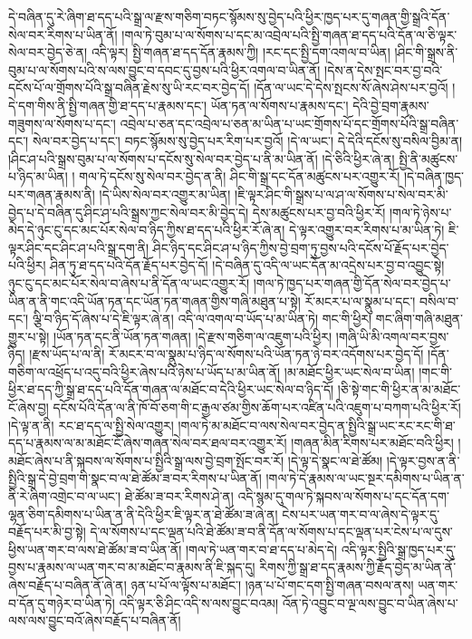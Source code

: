 དེ་བཞིན་དུ་རེ་ཞིག་ཐ་དད་པའི་སྒྲ་ལ་རྫས་གཅིག་བཏང་སྙོམས་སུ་བྱེད་པའི་ཕྱིར་ཁྱད་པར་དུ་གཞན་གྱི་སྒྲའི་དོན་སེལ་བར་རིགས་པ་ཡིན་ནོ། །གལ་ཏེ་བུམ་པ་ལ་སོགས་པ་དང་མ་འབྲེལ་པའི་སྤྱི་གཞན་ཐ་དད་པའི་དོན་ལ་ཅི་ལྟར་སེལ་བར་བྱེད་ཅེ་ན། འདི་ལྟར། སྤྱི་གཞན་ཐ་དད་དོན་རྣམས་ཀྱི། །རང་དང་སྤྱི་དག་འགལ་བ་ཡིན། །ཤིང་གི་སྒྲས་ནི་བུམ་པ་ལ་སོགས་པའི་ས་ལས་བྱུང་བ་དབང་དུ་བྱས་པའི་ཕྱིར་འགལ་བ་ཡིན་ནོ། །དེས་ན་དེས་སྤང་བར་བྱ་བའི་དངོས་པོ་ལ་གྲོགས་པོའི་སྒྲ་བཞིན་རྗེས་སུ་ཡི་རང་བར་བྱེད་དོ། །དོན་ལ་ཡང་དེ་དེས་སྤངས་སོ་ཞེས་ཤེས་པར་བྱའོ། །དེ་དག་གིས་ནི་སྤྱི་གཞན་གྱི་ཐ་དད་པ་རྣམས་དང་། ཡོན་ཏན་ལ་སོགས་པ་རྣམས་དང་། དེའི་བྱེ་བྲག་རྣམས་གཟུགས་ལ་སོགས་པ་དང་། འབྲེལ་པ་ཅན་དང་འབྲེལ་པ་ཅན་མ་ཡིན་པ་ཡང་གྲོགས་པོ་དང་གྲོགས་པོའི་སྒྲ་བཞིན་དང་། སེལ་བར་བྱེད་པ་དང་། བཏང་སྙོམས་སུ་བྱེད་པར་རིག་པར་བྱའོ། །དེ་ལ་ཡང་། དེ་དེའི་དངོས་སུ་བསིལ་བྱིམ་ན། །ཤིང་ཤ་པའི་སྒྲས་བུམ་པ་ལ་སོགས་པ་དངོས་སུ་སེལ་བར་བྱེད་པ་ནི་མ་ཡིན་ནོ། །དེ་ཅིའི་ཕྱིར་ཞེ་ན། སྤྱི་ནི་མཚུངས་པ་ཉིད་མ་ཡིན། །
གལ་ཏེ་དངོས་སུ་སེལ་བར་བྱེད་ན་ནི། ཤིང་གི་སྒྲ་དང་དོན་མཚུངས་པར་འགྱུར་རོ། །དེ་བཞིན་ཁྱད་པར་གཞན་རྣམས་ནི། །དེ་ཡིས་སེལ་བར་འགྱུར་མ་ཡིན། །ཇི་ལྟར་ཤིང་གི་སྒྲས་པ་ལ་ཤ་ལ་སོགས་པ་སེལ་བར་མི་བྱེད་པ་དེ་བཞིན་དུ་ཤིང་ཤ་པའི་སྒྲས་ཀྱང་སེལ་བར་མི་བྱེད་དེ། དེས་མཚུངས་པར་བྱ་བའི་ཕྱིར་རོ། །གལ་ཏེ་ཉེས་པ་མེད་དེ་ཉུང་ངུ་དང་མང་པོར་སེལ་བ་ཉིད་ཀྱིས་ཐ་དད་པའི་ཕྱིར་རོ་ཞེ་ན། དེ་ལྟར་འགྱུར་བར་རིགས་པ་མ་ཡིན་ཏེ། ཇི་ལྟར་ཤིང་དང་ཤིང་ཤ་པའི་སྒྲ་དག་ནི། ཤིང་ཉིད་དང་ཤིང་ཤ་པ་ཉིད་ཀྱིས་བྱེ་བྲག་ཏུ་བྱས་པའི་དངོས་པོ་རྗོད་པར་བྱེད་པའི་ཕྱིར། ཤིན་ཏུ་ཐ་དད་པའི་དོན་རྗོད་པར་བྱེད་དོ། །དེ་བཞིན་དུ་འདི་ལ་ཡང་དོན་མ་འདྲེས་པར་བྱ་བ་འབྱུང་སྟེ། ཉུང་ངུ་དང་མང་པོར་སེལ་བ་ཞེས་པ་ནི་དོན་ལ་ཡང་འགྱུར་རོ། །གལ་ཏེ་ཁྱད་པར་གཞན་གྱི་དོན་སེལ་བར་བྱེད་པ་ཡིན་ན་ནི་གང་འདི་ཡོན་ཏན་དང་ཡོན་ཏན་གཞན་གྱིས་གཞི་མཐུན་པ་སྟེ། རོ་མངར་པ་ལ་སྣུམ་པ་དང་། བསིལ་བ་དང་། ལྕི་བ་ཉིད་དོ་ཞེས་པ་དེ་ཇི་ལྟར་ཞེ་ན། འདི་ལ་འགལ་བ་ཡོད་པ་མ་ཡིན་ཏེ། གང་གི་ཕྱིར། གང་ཞིག་གཞི་མཐུན་གྱུར་པ་སྟེ། །ཡོན་ཏན་དང་ནི་ཡོན་ཏན་གཞན། །དེ་རྫས་གཅིག་ལ་འཇུག་པའི་ཕྱིར། །གཞི་ཡི་མི་འགལ་བར་བྱས་ཉིད། །རྫས་ཡོད་པ་ལ་ནི། རོ་མངར་བ་ལ་སྣུམ་པ་ཉིད་ལ་སོགས་པའི་ཡོན་ཏན་ཉེ་བར་འདོགས་པར་བྱེད་དོ། །དོན་གཅིག་ལ་འཕྲོད་པ་འདུ་བའི་ཕྱིར་ཞེས་པའི་ཉེས་པ་ཡོད་པ་མ་ཡིན་ནོ། །མ་མཐོང་ཕྱིར་ཡང་སེལ་བ་ཡིན། །གང་གི་ཕྱིར་ཐ་དད་ཀྱི་སྒྲ་ཐ་དད་པའི་དོན་གཞན་ལ་མཐོང་བ་དེའི་ཕྱིར་ཡང་སེལ་བ་ཉིད་དོ། །ཅི་སྟེ་གང་གི་ཕྱིར་ན་མ་མཐོང་ངོ་ཞེས་བྱ། དངོས་པོའི་དོན་ལ་ནི་ཁོ་བོ་ཅག་གི་ང་རྒྱལ་ཙམ་གྱིས་ཆོག་པར་འཛིན་པའི་འཇུག་པ་བཀག་པའི་ཕྱིར་རོ། །དེ་ལྟ་ན་ནི། རང་ཐ་དད་ལ་སྤྱི་སེལ་འགྱུར། །གལ་ཏེ་མ་མཐོང་བ་ལས་སེལ་བར་བྱེད་ན་སྤྱིའི་སྒྲ་ཡང་རང་རང་གི་ཐ་དད་པ་རྣམས་ལ་མ་མཐོང་ངོ་ཞེས་གཞན་སེལ་བར་ཐལ་བར་འགྱུར་རོ། །གཞན་མིན་རིགས་པར་མཐོང་བའི་ཕྱིར། །མཐོང་ཞེས་པ་ནི་སྐབས་ལ་སོགས་པ་སྤྱིའི་སྒྲ་ལས་བྱེ་བྲག་སྤོང་བར་རོ། །དེ་ལྟ་དེ་སྣང་ལ་ཐེ་ཚོམ། །དེ་ལྟར་བྱས་ན་ནི་སྤྱིའི་སྒྲ་དེ་བྱེ་བྲག་གི་སྣང་བ་ལ་ཐེ་ཚོམ་ཟ་བར་རིགས་པ་ཡིན་ནོ། །གལ་ཏེ་དེ་རྣམས་ལ་ཡང་སྔར་དམིགས་པ་ཡིན་ན་ནི་རེ་ཞིག་འགྲེང་བ་ལ་ཡང་། ཐེ་ཚོམ་ཟ་བར་རིགས་ཤེ་ན། འདི་སྙམ་དུ་གལ་ཏེ་སྐབས་ལ་སོགས་པ་དང་དོན་དག་ལྷན་ཅིག་དམིགས་པ་ཡིན་ན་ནི་དེའི་ཕྱིར་ཇི་ལྟར་ན་ཐེ་ཚོམ་ཟ་ཞེ་ན། ངེས་པར་ཡན་གར་བ་ལ་ཞེས་དེ་ལྟར་དུ་བརྗོད་པར་མི་བྱ་སྟེ། དེ་ལ་སོགས་པ་དང་ལྡན་པའི་ཐེ་ཚོམ་ཟ་བ་ནི་དོན་ལ་སོགས་པ་དང་ལྡན་པར་ངེས་པ་ལ་དུས་ཕྱིས་ཡན་གར་བ་ལས་ཐེ་ཚོམ་ཟ་བ་ཡིན་ནོ། །གལ་ཏེ་ཡན་གར་བ་ཐ་དད་པ་མེད་དེ། འདི་ལྟར་སྤྱིའི་སྒྲ་ཁྱད་པར་དུ་བྱས་པ་རྣམས་ལ་ཡན་གར་བ་མ་མཐོང་བ་རྣམས་ནི་ཇི་སྐད་དུ། རིགས་ཀྱི་སྒྲ་ཐ་དད་རྣམས་ཀྱི་རྗོད་བྱེད་མ་ཡིན་ནོ་ཞེས་བརྗོད་པ་བཞིན་ནོ་ཞེ་ན། ཉན་པ་པོ་ལ་ལྟོས་པ་མཐོང་། །ཉན་པ་པོ་གང་དག་སྤྱི་གཞན་བསལ་ནས། ཡན་གར་བ་དོན་དུ་གཉེར་བ་ཡིན་ཏེ། འདི་ལྟར་ཅི་ཤིང་འདི་ས་ལས་བྱུང་བའམ། འོན་ཏེ་འབྱུང་བ་ལྔ་ལས་བྱུང་བ་ཡིན་ཞེས་པ་ལས་ལས་བྱུང་བའོ་ཞེས་བརྗོད་པ་བཞིན་ནོ། 